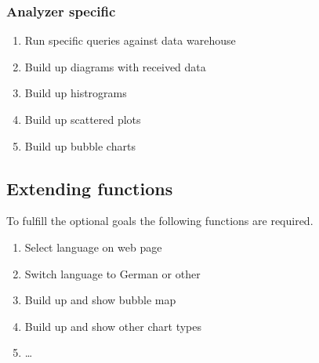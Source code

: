 \subsubsection*{Analyzer specific} 
 
\begin{enumerate}[resume]
  
  \item Run specific queries against data warehouse  
  
  \item Build up diagrams with received data  %
  
  \item Build up histrograms
  
  \item Build up scattered plots
  
  \item Build up bubble charts

\end{enumerate}


\subsection{Extending functions}

To fulfill the optional goals the following functions are required.

\begin{enumerate}[resume]
  
  \item Select language on web page
  
  \item Switch language to German or other
  
  \item Build up and show bubble map %
  
  \item Build up and show other chart types
  
  \item \ldots 
 
\end{enumerate}
